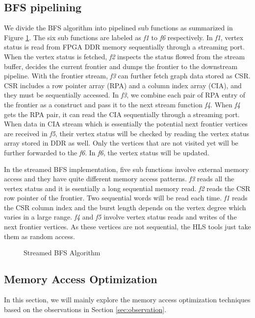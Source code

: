 \subsection{BFS pipelining}
We divide the BFS algorithm into pipelined 
sub functions as summarized in Figure \ref{fig:bfs-stream}. 
The six sub functions are labeled as \textit{f1} to \textit{f6} respectively. In \textit{f1}, 
vertex status is read from FPGA DDR memory sequentially through a streaming port. 
When the vertex status is fetched, \textit{f2} inspects the status 
flowed from the stream buffer, decides the current frontier 
and dumps the frontier to the downstream pipeline. 
With the frontier stream, \textit{f3} can further fetch graph 
data stored as CSR. CSR includes a row pointer array (RPA) 
and a column index array (CIA), and they must be sequentially accessed. 
In \textit{f3}, we combine each pair of RPA entry of the frontier as a construct 
and pass it to the next stream function \textit{f4}. When \textit{f4} gets the RPA pair, 
it can read the CIA sequentially through a streaming port. 
When data in CIA stream which is essentially the potential 
next frontier vertices are received in \textit{f5}, their vertex status 
will be checked by reading the vertex status array stored in DDR as well.
Only the vertices that are not visited yet will be further forwarded to the \textit{f6}. 
In \textit{f6}, the vertex status will be updated.

In the streamed BFS implementation, five sub functions involve external memory access 
and they have quite different memory access patterns. \textit{f3} reads all the vertex 
status and it is esentially a long sequential memory read. \textit{f2} reads the CSR 
row pointer of the frontier. Two sequential words will be read each time. 
\textit{f1} reads the CSR column index and the 
burst length depends on the vertex degree which varies in a large range. 
\textit{f4} and \textit{f5} involve vertex status reads and writes of the next frontier vertices.
As these vertices are not sequential, the HLS tools just take them as random access. 

\begin{figure}
\caption{Streamed BFS Algorithm}
\label{fig:bfs-stream}
\vspace{-1.5em}
\end{figure}

\subsection{Memory Access Optimization}
In this section, we will mainly explore the memory 
access optimization techniques based on the observations 
in Section \ref{sec:observation}.

